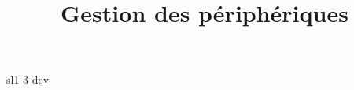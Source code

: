 \documentclass {beamer}
\title {Gestion des périphériques}
\begin{document}
 {sl1-3-dev}
\end{document}
